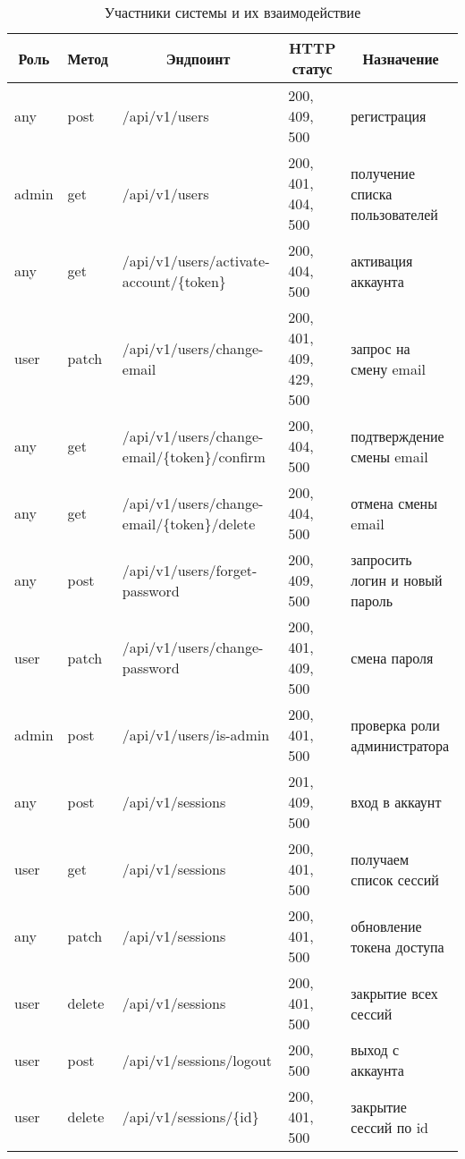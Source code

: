 \begin{sidewaystable}
    \small
    \caption{Участники системы и их взаимодействие} \label{tabl:swagger}

    \begin{tabular}{|p{1cm}|p{1cm}|p{8.5cm}|p{4.8cm}|p{8cm}|}
        \hline
        \multicolumn{1}{|c|}{Роль}
        & \multicolumn{1}{c|}{Метод}
        & \multicolumn{1}{c|}{Эндпоинт}
        & \multicolumn{1}{c|}{HTTP статус}
        & \multicolumn{1}{c|}{Назначение}
        \\ \hline

        any & post & /api/v1/users & 200, 409, 500 & регистрация \\ \hline 
        admin & get & /api/v1/users & 200, 401, 404, 500 & получение списка пользователей \\ \hline 
        any & get & /api/v1/users/activate-account/\{token\} & 200, 404, 500 & активация аккаунта \\ \hline 
        user & patch & /api/v1/users/change-email & 200, 401, 409, 429, 500 & запрос на смену email \\ \hline 
        any & get & /api/v1/users/change-email/\{token\}/confirm & 200, 404, 500 & подтверждение смены email \\ \hline 
        any & get & /api/v1/users/change-email/\{token\}/delete & 200, 404, 500 & отмена смены email \\ \hline 
        any & post & /api/v1/users/forget-password & 200, 409, 500 & запросить логин и новый пароль \\ \hline 
        user & patch & /api/v1/users/change-password & 200, 401, 409, 500 & смена пароля \\ \hline
        admin & post & /api/v1/users/is-admin & 200, 401, 500 & проверка роли администратора\\ \hline 
        any & post & /api/v1/sessions & 201, 409, 500 & вход в аккаунт \\ \hline 
        user & get & /api/v1/sessions & 200, 401, 500 & получаем список сессий \\ \hline 
        any & patch & /api/v1/sessions & 200, 401, 500 & обновление токена доступа \\ \hline 
        user & delete & /api/v1/sessions & 200, 401, 500 & закрытие всех сессий \\ \hline 
        user & post & /api/v1/sessions/logout & 200, 500 & выход с аккаунта \\ \hline 
        user & delete & /api/v1/sessions/\{id\} & 200, 401, 500 & закрытие сессий по id \\ \hline 

\end{tabular}
\end{sidewaystable}
